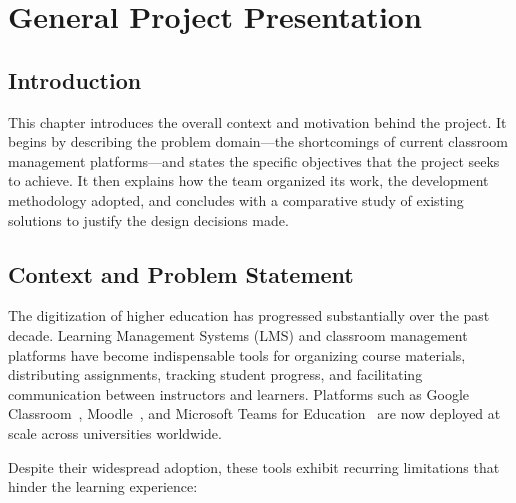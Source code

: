 \chapter{General Project Presentation}
\label{chap:presentation}

\section*{Introduction}

This chapter introduces the overall context and motivation behind the \eduspace{} project.
It begins by describing the problem domain---the shortcomings of current classroom management platforms---and states the specific objectives that the project seeks to achieve.
It then explains how the team organized its work, the development methodology adopted, and concludes with a comparative study of existing solutions to justify the design decisions made.

\section{Context and Problem Statement}
\label{sec:context}

The digitization of higher education has progressed substantially over the past decade.
Learning Management Systems (LMS) and classroom management platforms have become indispensable tools for organizing course materials, distributing assignments, tracking student progress, and facilitating communication between instructors and learners.
Platforms such as Google Classroom~\cite{googleclassroom2024}, Moodle~\cite{moodle2024}, and Microsoft Teams for Education~\cite{msteams2024edu} are now deployed at scale across universities worldwide.

Despite their widespread adoption, these tools exhibit recurring limitations that hinder the learning experience:

